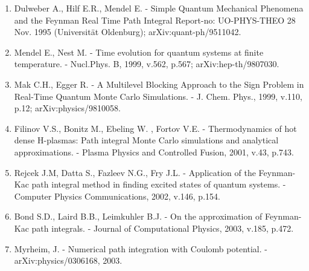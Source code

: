 \documentclass[11pt]{article}
\begin{document}
{\begin{enumerate}
\item Dulweber A., Hilf E.R., Mendel E. -
	Simple Quantum Mechanical Phenomena and the Feynman Real Time Path Integral
	Report-no: UO-PHYS-THEO 28 Nov. 1995 (Universit\"at Oldenburg); arXiv:quant-ph/9511042.
\item Mendel E., Nest M. - Time evolution for quantum systems at finite    temperature. -
	Nucl.Phys. B, 1999, v.562, p.567; %
	arXiv:hep-th/9807030.
\item  Mak C.H.,  Egger R. - 
	A Multilevel Blocking Approach to the Sign Problem in Real-Time Quantum
	Monte Carlo Simulations. - J. Chem. Phys., 1999, v.110, p.12;
	arXiv:physics/9810058.
\item Filinov V.S., Bonitz M., Ebeling W. , Fortov V.E. - Thermodynamics
	of hot dense H-plasmas: Path integral Monte Carlo simulations and analytical
	approximations. - Plasma Physics and Controlled Fusion, 2001, v.43, p.743.
\item Rejcek J.M, Datta S., Fazleev N.G., Fry J.L. - Application of the Feynman-Kac
	path integral method in finding excited states of quantum systems. -
	Computer Physics Communications, 2002, v.146, p.154. %
\item Bond S.D.,  Laird B.B., Leimkuhler B.J. -
	On the approximation of Feynman-Kac path integrals. -
	Journal of Computational Physics, 2003, v.185, p.472. %
\item Myrheim, J. - Numerical path integration with Coulomb potential. -
	arXiv:physics/0306168, 2003.
\end{enumerate}

}
\end{document}
